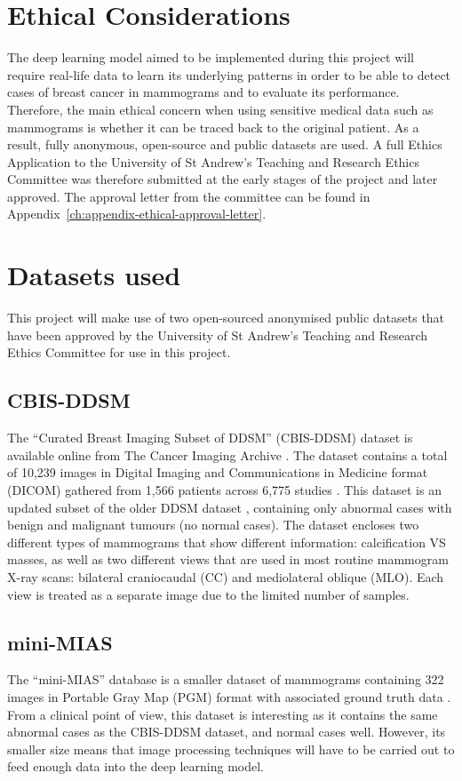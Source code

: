 \section{Ethical Considerations}

The deep learning model aimed to be implemented during this project will require real-life data to learn its underlying patterns in order to be able to detect cases of breast cancer in mammograms and to evaluate its performance. Therefore, the main ethical concern when using sensitive medical data such as  mammograms is whether it can be traced back to the original patient. As a result, fully anonymous, open-source and public datasets are used. A full Ethics Application to the University of St Andrew's Teaching and Research Ethics Committee was therefore submitted at the early stages of the project and later approved. The approval letter from the committee can be found in Appendix~\ref{ch:appendix-ethical-approval-letter}.


\section{Datasets used}

This project will make use of two open-sourced anonymised public datasets that have been approved by the University of St Andrew's Teaching and Research Ethics Committee for use in this project.

\subsection{CBIS-DDSM}

The ``Curated Breast Imaging Subset of DDSM'' (CBIS-DDSM) dataset \citep{Lee2017} is available online from The Cancer Imaging Archive \citep{Clark2013}. The dataset contains a total of 10,239 images in Digital Imaging and Communications in Medicine format (DICOM) gathered from 1,566 patients across 6,775 studies \citep{Lee2017}. This dataset is an updated subset of the older DDSM dataset \citep{DDSMdataset2001}, containing only abnormal cases with benign and malignant tumours (no normal cases). The dataset encloses two different types of mammograms that show different information: calcification VS masses, as well as two different views that are used in most routine mammogram X-ray scans: bilateral craniocaudal (CC) and mediolateral oblique (MLO). Each view is treated as a separate image due to the limited number of samples.

\subsection{mini-MIAS}

The ``mini-MIAS'' database is a smaller dataset of mammograms containing 322 images in Portable Gray Map (PGM) format with associated ground truth data \citep{Suckling1994}. From a clinical point of view, this dataset is interesting as it contains the same abnormal cases as the CBIS-DDSM dataset, and normal cases well. However, its smaller size means that image processing techniques will have to be carried out to feed enough data into the deep learning model.